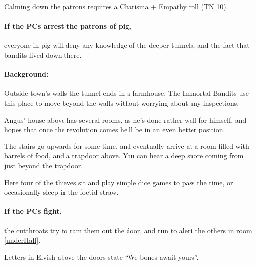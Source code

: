 \begin{multicols}{2}
Calming down the patrons requires a Charisma + Empathy roll (TN 10).

\paragraph{If the PCs arrest the patrons of \gls{pig},}
everyone in \gls{pig} will deny any knowledge of the deeper tunnels, and the fact that bandits lived down there.


\paragraph{Background:}
Outside \gls{town}'s walls the tunnel ends in a farmhouse.
The Immortal Bandits use this place to move beyond the walls without worrying about any inspections.

Angus' house above has several rooms, as he's done rather well for himself, and hopes that once the revolution comes he'll be in an even better position.

\begin{boxtext}

  The stairs go upwards for some time, and eventually arrive at a room filled with barrels of food, and a trapdoor above.
  You can hear a deep snore coming from just beyond the trapdoor.

\end{boxtext}



Here four of the thieves sit and play simple dice games to pass the time, or occasionally sleep in the foetid straw.

\paragraph{If the PCs fight,}
the cutthroats try to ram them out the door, and run to alert the others in room \ref{underHall}.



\begin{boxtext}
  Letters in Elvish above the doors state ``We bones await yours''.
\end{boxtext}


\end{multicols}
